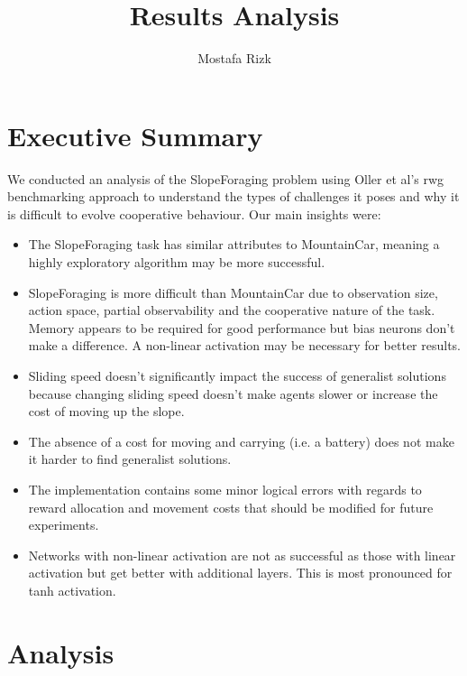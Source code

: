 \documentclass[12pt]{article}
\title{Results Analysis}
\author{Mostafa Rizk}
\begin{document}
\maketitle
\tableofcontents

\section{Executive Summary}

We conducted an analysis of the SlopeForaging problem using Oller et al's rwg benchmarking approach to understand the types of challenges it poses and why it is difficult to evolve cooperative behaviour. Our main insights were:

\begin{itemize}
\item The SlopeForaging task has similar attributes to MountainCar, meaning a highly exploratory algorithm may be more successful.

\item SlopeForaging is more difficult than MountainCar due to observation size, action space, partial observability and the cooperative nature of the task. Memory appears to be required for good performance but bias neurons don't make a difference. A non-linear activation may be necessary for better results.

\item Sliding speed doesn't significantly impact the success of generalist solutions because changing sliding speed doesn't make agents slower or increase the cost of moving up the slope.

\item The absence of a cost for moving and carrying (i.e. a battery) does not make it harder to find generalist solutions.

\item The implementation contains some minor logical errors with regards to reward allocation and movement costs that should be modified for future experiments.

\item Networks with non-linear activation are not as successful as those with linear activation but get better with additional layers. This is most pronounced for tanh activation.

\end{itemize}

\section{Analysis}
		
\end{document}
